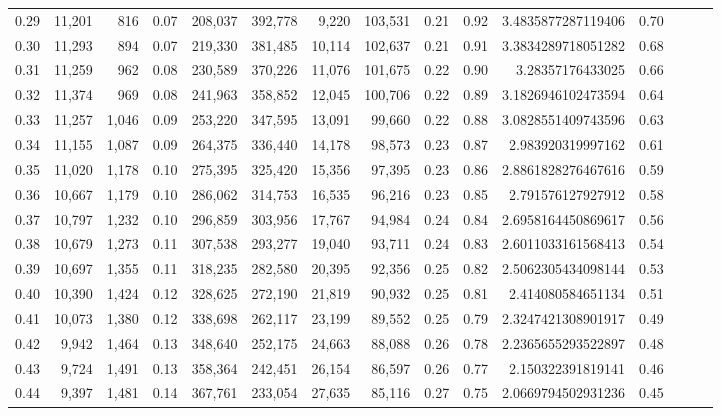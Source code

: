 \begin{tabular}{rrrrrrrrrrrrrrr}
0.29 &  11,201 &    816 &  0.07 &  208,037 &  392,778 &    9,220 &  103,531 &  0.21 &  0.92 &      3.4835877287119406 &      0.70 \\
0.30 &  11,293 &    894 &  0.07 &  219,330 &  381,485 &   10,114 &  102,637 &  0.21 &  0.91 &      3.3834289718051282 &      0.68 \\
0.31 &  11,259 &    962 &  0.08 &  230,589 &  370,226 &   11,076 &  101,675 &  0.22 &  0.90 &        3.28357176433025 &      0.66 \\
0.32 &  11,374 &    969 &  0.08 &  241,963 &  358,852 &   12,045 &  100,706 &  0.22 &  0.89 &      3.1826946102473594 &      0.64 \\
0.33 &  11,257 &  1,046 &  0.09 &  253,220 &  347,595 &   13,091 &   99,660 &  0.22 &  0.88 &      3.0828551409743596 &      0.63 \\
0.34 &  11,155 &  1,087 &  0.09 &  264,375 &  336,440 &   14,178 &   98,573 &  0.23 &  0.87 &       2.983920319997162 &      0.61 \\
0.35 &  11,020 &  1,178 &  0.10 &  275,395 &  325,420 &   15,356 &   97,395 &  0.23 &  0.86 &      2.8861828276467616 &      0.59 \\
0.36 &  10,667 &  1,179 &  0.10 &  286,062 &  314,753 &   16,535 &   96,216 &  0.23 &  0.85 &       2.791576127927912 &      0.58 \\
0.37 &  10,797 &  1,232 &  0.10 &  296,859 &  303,956 &   17,767 &   94,984 &  0.24 &  0.84 &      2.6958164450869617 &      0.56 \\
0.38 &  10,679 &  1,273 &  0.11 &  307,538 &  293,277 &   19,040 &   93,711 &  0.24 &  0.83 &      2.6011033161568413 &      0.54 \\
0.39 &  10,697 &  1,355 &  0.11 &  318,235 &  282,580 &   20,395 &   92,356 &  0.25 &  0.82 &      2.5062305434098144 &      0.53 \\
0.40 &  10,390 &  1,424 &  0.12 &  328,625 &  272,190 &   21,819 &   90,932 &  0.25 &  0.81 &       2.414080584651134 &      0.51 \\
0.41 &  10,073 &  1,380 &  0.12 &  338,698 &  262,117 &   23,199 &   89,552 &  0.25 &  0.79 &      2.3247421308901917 &      0.49 \\
0.42 &   9,942 &  1,464 &  0.13 &  348,640 &  252,175 &   24,663 &   88,088 &  0.26 &  0.78 &      2.2365655293522897 &      0.48 \\
0.43 &   9,724 &  1,491 &  0.13 &  358,364 &  242,451 &   26,154 &   86,597 &  0.26 &  0.77 &       2.150322391819141 &      0.46 \\
0.44 &   9,397 &  1,481 &  0.14 &  367,761 &  233,054 &   27,635 &   85,116 &  0.27 &  0.75 &      2.0669794502931236 &      0.45 \\

\end{tabular}
